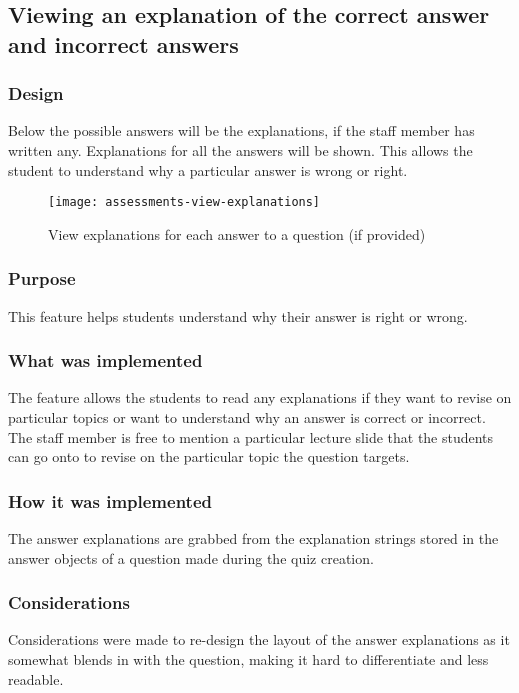 \subsection{Viewing an explanation of the correct answer and incorrect answers}

\subsubsection{Design}
Below the possible answers will be the explanations, if the staff member has written any. Explanations for all the answers will be shown. This allows the student to understand why a particular answer is wrong or right.

\begin{figure}[h!]
	\centering
	\texttt{[image: assessments-view-explanations]}
	\caption{View explanations for each answer to a question (if provided)}
\end{figure}

\subsubsection{Purpose}
This feature helps students understand why their answer is right or wrong.

\subsubsection{What was implemented}
The feature allows the students to read any explanations if they want to revise on particular topics or want to understand why an answer is correct or incorrect. The staff member is free to mention a particular lecture slide that the students can go onto to revise on the particular topic the question targets.

\subsubsection{How it was implemented}
The answer explanations are grabbed from the explanation strings stored in the answer objects of a question made during the quiz creation.

\subsubsection{Considerations}
Considerations were made to re-design the layout of the answer explanations as it somewhat blends in with the question, making it hard to differentiate and less readable.

